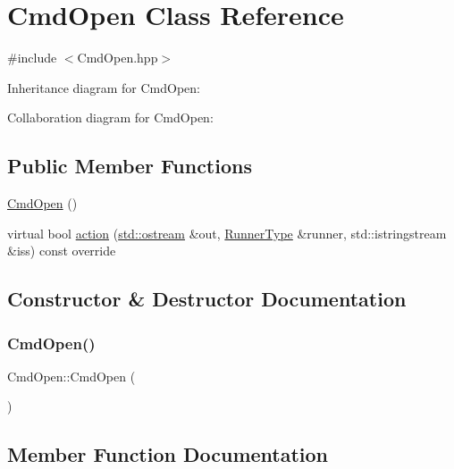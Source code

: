 \hypertarget{classCmdOpen}{}\section{Cmd\+Open Class Reference}
\label{classCmdOpen}


{\ttfamily \#include $<$Cmd\+Open.\+hpp$>$}



Inheritance diagram for Cmd\+Open\+:


Collaboration diagram for Cmd\+Open\+:
\subsection*{Public Member Functions}
\begin{DoxyCompactItemize}
\item 
\hyperlink{classCmdOpen_a2dba3a6273257100a1ea1d07335f3426}{Cmd\+Open} ()
\item 
virtual bool \hyperlink{classCmdOpen_adc72961afcb2a282e4e627273e111281}{action} (\hyperlink{doctest_8h_a116af65cb5e924b33ad9d9ecd7a783f3}{std\+::ostream} \&out, \hyperlink{Command_8hpp_ad45c3de597c2023a8be0399d914161f4}{Runner\+Type} \&runner, std\+::istringstream \&iss) const override
\end{DoxyCompactItemize}


\subsection{Constructor \& Destructor Documentation}
\mbox{\label{classCmdOpen_a2dba3a6273257100a1ea1d07335f3426}} 
\subsubsection{\texorpdfstring{Cmd\+Open()}{CmdOpen()}}
{\footnotesize\ttfamily Cmd\+Open\+::\+Cmd\+Open (\begin{DoxyParamCaption}{ }\end{DoxyParamCaption})}



\subsection{Member Function Documentation}
\mbox{\label{classCmdOpen_adc72961afcb2a282e4e627273e111281}} 
